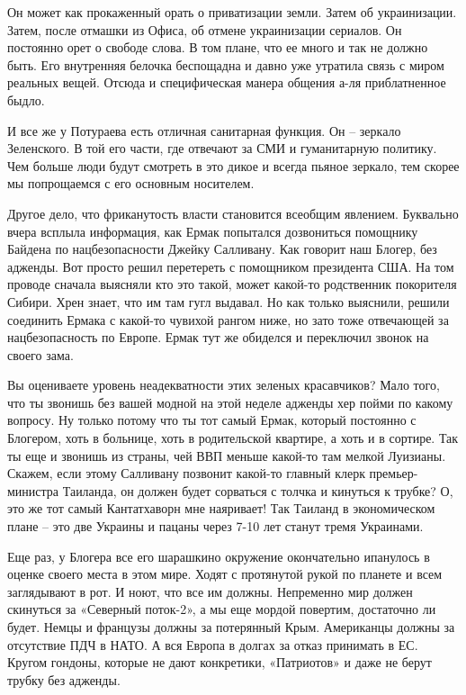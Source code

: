 Он может как прокаженный орать о приватизации земли. Затем об украинизации.
Затем, после отмашки из Офиса, об отмене украинизации сериалов. Он постоянно
орет о свободе слова. В том плане, что ее много и так не должно быть. Его
внутренняя белочка беспощадна и давно уже утратила связь с миром реальных
вещей. Отсюда и специфическая манера общения а-ля приблатненное быдло.

И все же у Потураева есть отличная санитарная функция. Он – зеркало Зеленского.
В той его части, где отвечают за СМИ и гуманитарную политику. Чем больше люди
будут смотреть в это дикое и всегда пьяное зеркало, тем скорее мы попрощаемся с
его основным носителем.

Другое дело, что фриканутость власти становится всеобщим явлением. Буквально
вчера всплыла информация, как Ермак попытался дозвониться помощнику Байдена по
нацбезопасности Джейку Салливану. Как говорит наш Блогер, без адженды. Вот
просто решил перетереть с помощником президента США. На том проводе сначала
выясняли кто это такой, может какой-то родственник покорителя Сибири. Хрен
знает, что им там гугл выдавал. Но как только выяснили, решили соединить Ермака
с какой-то чувихой рангом ниже, но зато тоже отвечающей за нацбезопасность по
Европе. Ермак тут же обиделся и переключил звонок на своего зама.

Вы оцениваете уровень неадекватности этих зеленых красавчиков? Мало того, что
ты звонишь без вашей модной на этой неделе адженды хер пойми по какому вопросу.
Ну только потому что ты тот самый Ермак, который постоянно с Блогером, хоть в
больнице, хоть в родительской квартире, а хоть и в сортире. Так ты еще и
звонишь из страны, чей ВВП меньше какой-то там мелкой Луизианы. Скажем, если
этому Салливану позвонит какой-то главный клерк премьер-министра Таиланда, он
должен будет сорваться с толчка и кинуться к трубке? О, это же тот самый
Кантатхаворн мне наяривает! Так Таиланд в экономическом плане – это две Украины
и пацаны через 7-10 лет станут тремя Украинами.

Еще раз, у Блогера все его шарашкино окружение окончательно ипанулось в оценке
своего места в этом мире. Ходят с протянутой рукой по планете и всем
заглядывают в рот. И ноют, что все им должны. Непременно мир должен скинуться
за «Северный поток-2», а мы еще мордой повертим, достаточно ли будет. Немцы и
французы должны за потерянный Крым. Американцы должны за отсутствие ПДЧ в НАТО.
А вся Европа в долгах за отказ принимать в ЕС. Кругом гондоны, которые не дают
конкретики, «Патриотов» и даже не берут трубку без адженды.

